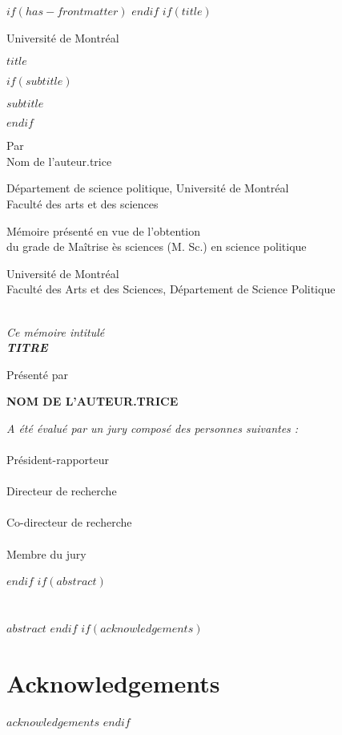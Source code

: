$if(has-frontmatter)$
\frontmatter
$endif$
$if(title)$
\cleardoublepage
\thispagestyle{empty}
{\centering
Université de Montréal \\[2.5cm]
{\itshape $title$ \par}
$if(subtitle)$
{\itshape $subtitle$ \par}
$endif$
\vspace{2.5cm}
{Par \\ Nom de l'auteur.trice \par} %
\vspace{2.5cm}
{Département de science politique, Université de Montréal \\ 
Faculté des arts et des sciences \par}
\vspace{2.5cm}
{Mémoire présenté en vue de l'obtention \\ 
du grade de Maîtrise ès sciences (M. Sc.) en science politique \par}
\vspace{2.5cm}
{ \par} %
\vspace{2.5cm}
{\textcopyright{} } %
\clearpage
}
{\centering
Université de Montréal \\
Faculté des Arts et des Sciences, Département de Science Politique \\
\hrulefill \\[2.5cm]
{\itshape Ce mémoire intitulé \\
\textbf{ TITRE } \par}  %
\vspace{2.5cm}
Présenté par \\
{\textbf{NOM DE L'AUTEUR.TRICE} \par}  %
\vspace{2.5cm}
{\itshape A été évalué par un jury composé des personnes suivantes :} \\[1cm]
{\textbf{ }} \\ Président-rapporteur \\[1cm] %
{\textbf{ }} \\ Directeur de recherche \\[1cm] %
{\textbf{ }} \\ Co-directeur de recherche \\[1cm] %
{\textbf{ }} \\ Membre du jury \\ %
}
$endif$
$if(abstract)$
\cleardoublepage
\thispagestyle{plain}
\section*{}
$abstract$
$endif$
$if(acknowledgements)$
\cleardoublepage
\thispagestyle{plain}
\section*{Acknowledgements}
$acknowledgements$
$endif$

